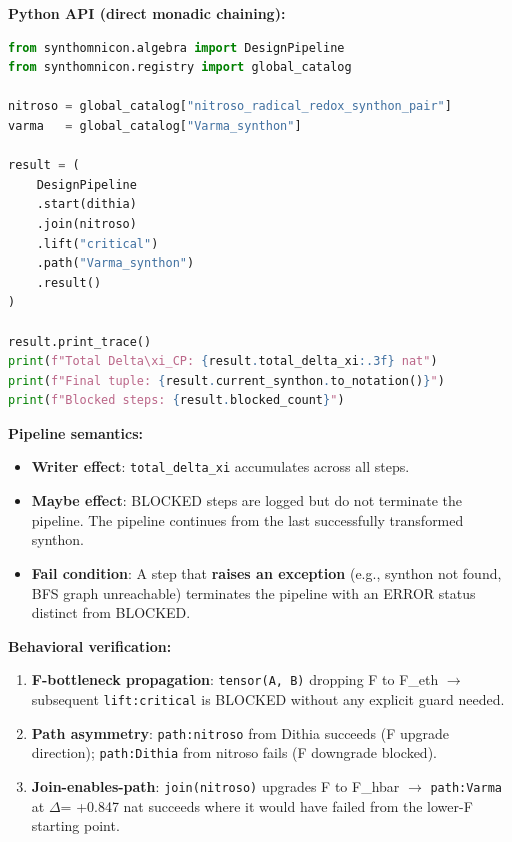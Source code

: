 \documentclass[12pt,a4paper]{article}
\begin{document}
\textbf{Python API (direct monadic chaining):}

\begin{lstlisting}[language=Python]
from synthomnicon.algebra import DesignPipeline
from synthomnicon.registry import global_catalog

nitroso = global_catalog["nitroso_radical_redox_synthon_pair"]
varma   = global_catalog["Varma_synthon"]

result = (
    DesignPipeline
    .start(dithia)
    .join(nitroso)
    .lift("critical")
    .path("Varma_synthon")
    .result()
)

result.print_trace()
print(f"Total Delta\xi_CP: {result.total_delta_xi:.3f} nat")
print(f"Final tuple: {result.current_synthon.to_notation()}")
print(f"Blocked steps: {result.blocked_count}")
\end{lstlisting}

\textbf{Pipeline semantics:}

\begin{itemize}
    \item \textbf{Writer effect}: \texttt{total\_delta\_xi} accumulates across all steps.
    \item \textbf{Maybe effect}: BLOCKED steps are logged but do not terminate the pipeline. The pipeline continues from the last successfully transformed synthon.
    \item \textbf{Fail condition}: A step that \textbf{raises an exception} (e.g., synthon not found, BFS graph unreachable) terminates the pipeline with an ERROR status distinct from BLOCKED.
\end{itemize}

\textbf{Behavioral verification:}

\begin{enumerate}
    \item \textbf{F-bottleneck propagation}: \texttt{tensor(A, B)} dropping F to F\_eth $\rightarrow$ subsequent \texttt{lift:critical} is BLOCKED without any explicit guard needed.
    \item \textbf{Path asymmetry}: \texttt{path:nitroso} from Dithia succeeds (F upgrade direction); \texttt{path:Dithia} from nitroso fails (F downgrade blocked).
    \item \textbf{Join-enables-path}: \texttt{join(nitroso)} upgrades F to F\_hbar $\rightarrow$ \texttt{path:Varma} at $\Delta$\xi = +0.847 nat succeeds where it would have failed from the lower-F starting point.
\end{enumerate}
\end{document}
